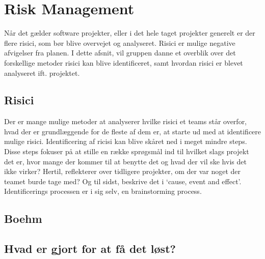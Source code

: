 \chapter{Risk Management}\label{ch:Risk Management}

Når det gælder software projekter, eller i det hele taget projekter generelt er der flere risici, som bør blive overvejet og analyseret. Risici er mulige negative afvigelser fra planen.\cite{Slide2} I dette afsnit, vil gruppen danne et overblik over det forskellige metoder risici kan blive identificeret, samt hvordan risici er blevet analyseret ift. projektet. 

\section{Risici}
  
Der er mange mulige metoder at analyserer hvilke risici et teams står overfor, hvad der er grundlæggende for de fleste af dem er, at starte ud med at identificere mulige risici. 
Identificering af ricisi kan blive skåret ned i meget mindre steps. \cite{Slide2} Disse steps fokuser på at stille en række sprøgsmål ind til hvilket slags projekt det er, hvor mange der kommer til at benytte det og hvad der vil ske hvis det ikke virker? Hertil, reflekterer over tidligere projekter, om der var noget der teamet burde tage med? Og til sidst, beskrive det i ‘cause, event and effect’. Identificerings processen er i sig selv, en brainstorming process. 


\section{Boehm}


\section{Hvad er gjort for at få det løst?}